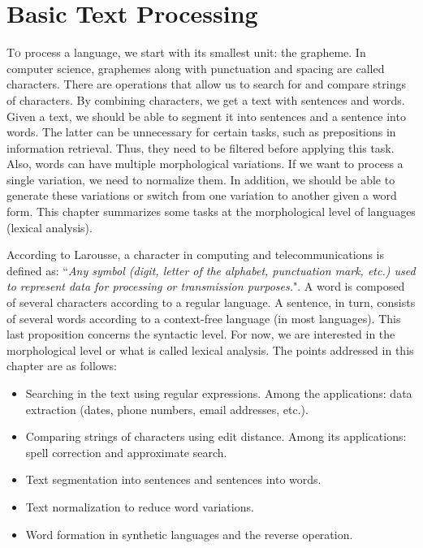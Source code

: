 \documentclass{KBook}
\begin{document}
		\mainmatter
	
\fi

\chapter{Basic Text Processing}

\begin{introduction}
	\lettrine{T}{o} process a language, we start with its smallest unit: the grapheme. 
	In computer science, graphemes along with punctuation and spacing are called characters. 
	There are operations that allow us to search for and compare strings of characters.
	By combining characters, we get a text with sentences and words. 
	Given a text, we should be able to segment it into sentences and a sentence into words. 
	The latter can be unnecessary for certain tasks, such as prepositions in information retrieval. 
	Thus, they need to be filtered before applying this task. 
	Also, words can have multiple morphological variations. 
	If we want to process a single variation, we need to normalize them. 
	In addition, we should be able to generate these variations or switch from one variation to another given a word form. 
	This chapter summarizes some tasks at the morphological level of languages (lexical analysis).
\end{introduction} 

According to Larousse, a character in computing and telecommunications is defined as: ``\textit{Any symbol (digit, letter of the alphabet, punctuation mark, etc.) used to represent data for processing or transmission purposes.}".
A word is composed of several characters according to a regular language. 
A sentence, in turn, consists of several words according to a context-free language (in most languages). 
This last proposition concerns the syntactic level.
For now, we are interested in the morphological level or what is called lexical analysis.
The points addressed in this chapter are as follows: 
\begin{itemize}
	\item Searching in the text using regular expressions. 
	Among the applications: data extraction (dates, phone numbers, email addresses, etc.).
	
	\item Comparing strings of characters using edit distance. 
	Among its applications: spell correction and approximate search.
	
	\item Text segmentation into sentences and sentences into words. 
	
	\item Text normalization to reduce word variations.
	
	\item Word formation in synthetic languages and the reverse operation.
\end{itemize}
\end{document}
